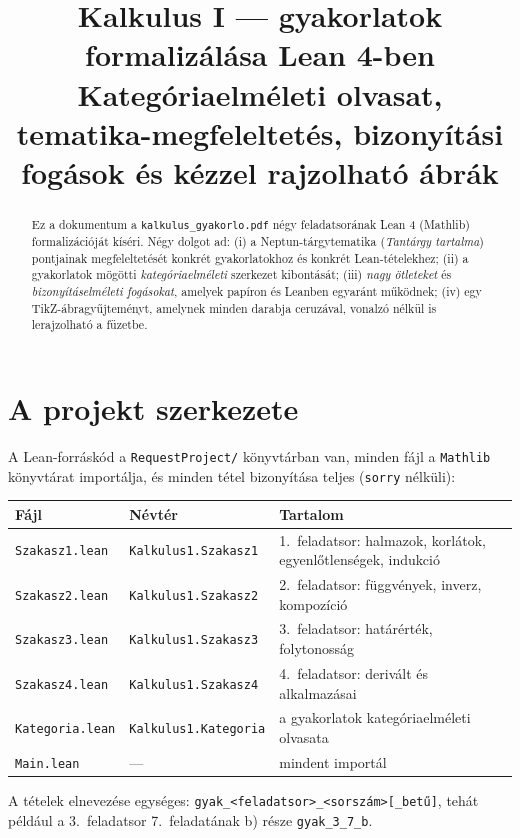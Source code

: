 \documentclass[11pt,a4paper]{article}
\title{\textbf{Kalkulus I --- gyakorlatok formalizálása Lean 4-ben}\\[2mm]
\large Kategóriaelméleti olvasat, tematika-megfeleltetés, bizonyítási fogások és kézzel rajzolható ábrák}
\author{}
\date{}
\newcommand{\lean}[1]{\texttt{\small #1}}
\theoremstyle{definition}
\begin{document}
\maketitle

\begin{abstract}
Ez a dokumentum a \lean{kalkulus\_gyakorlo.pdf} négy feladatsorának Lean 4 (Mathlib)
formalizációját kíséri. Négy dolgot ad: (i) a Neptun-tárgytematika
(\emph{Tantárgy tartalma}) pontjainak megfeleltetését konkrét gyakorlatokhoz és
konkrét Lean-tételekhez; (ii) a gyakorlatok mögötti \emph{kategóriaelméleti}
szerkezet kibontását; (iii) \emph{nagy ötleteket} és \emph{bizonyításelméleti
fogásokat}, amelyek papíron és Leanben egyaránt működnek; (iv) egy TikZ-ábragyűjteményt,
amelynek minden darabja ceruzával, vonalzó nélkül is lerajzolható a füzetbe.
\end{abstract}

\tableofcontents

\section{A projekt szerkezete}

A Lean-forráskód a \lean{RequestProject/} könyvtárban van, minden fájl a
\lean{Mathlib} könyvtárat importálja, és minden tétel bizonyítása teljes
(\lean{sorry} nélküli):

\begin{center}
\begin{tabular}{@{}lll@{}}
\toprule
Fájl & Névtér & Tartalom \\
\midrule
\lean{Szakasz1.lean} & \lean{Kalkulus1.Szakasz1} & 1.~feladatsor: halmazok, korlátok, egyenlőtlenségek, indukció \\
\lean{Szakasz2.lean} & \lean{Kalkulus1.Szakasz2} & 2.~feladatsor: függvények, inverz, kompozíció \\
\lean{Szakasz3.lean} & \lean{Kalkulus1.Szakasz3} & 3.~feladatsor: határérték, folytonosság \\
\lean{Szakasz4.lean} & \lean{Kalkulus1.Szakasz4} & 4.~feladatsor: derivált és alkalmazásai \\
\lean{Kategoria.lean} & \lean{Kalkulus1.Kategoria} & a gyakorlatok kategóriaelméleti olvasata \\
\lean{Main.lean} & --- & mindent importál \\
\bottomrule
\end{tabular}
\end{center}

A tételek elnevezése egységes: \lean{gyak\_<feladatsor>\_<sorszám>[\_betű]}, tehát
például a 3.~feladatsor 7.~feladatának b) része \lean{gyak\_3\_7\_b}.
\end{document}
